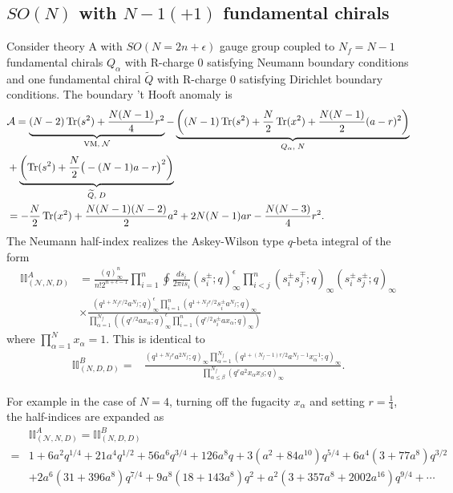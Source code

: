 \documentclass[12pt]{article}
\newcommand{\Acal}{\mathcal{A}}
\newcommand{\Ncal}{\mathcal{N}}
\DeclareMathOperator*{\Tr}{{\rm Tr}}
\numberwithin{equation}{section}
\begin{document}
\subsection{$SO(N)$ with $N-1 (+1)$ fundamental chirals}
\label{sec_SON_N_integrals}
Consider theory A with $SO(N = 2n + \epsilon)$ gauge group coupled to $N_f = N - 1$ fundamental chirals $Q_{\alpha}$ 
with R-charge $0$ satisfying Neumann boundary conditions and one fundamental chiral $\widetilde{Q}$ with R-charge $0$ satisfying Dirichlet boundary conditions. The boundary 't Hooft anomaly is
\begin{align}
\label{bdy_SON_N_anomA}
&
\Acal = \underbrace{(N-2)\Tr(s^2) + \frac{N(N-1)}{4}r^2}_{\textrm{VM}, \; \Ncal}
 - \underbrace{\left( (N-1)\Tr(s^2) + \frac{N}{2}\Tr(x^2) + \frac{N(N-1)}{2}(a-r)^2 \right)}_{Q_{\alpha}, \; N}
  \nonumber \\
 & + \underbrace{\left( \Tr(s^2) + \frac{N}{2}\big( -(N-1) a - r \big)^2 \right)}_{\widetilde{Q}, \; D}
   \nonumber \\
  &= - \frac{N}{2} \Tr(x^2) + \frac{N(N-1)(N-2)}{2}a^2 + 2N(N-1)ar - \frac{N(N-3)}{4}r^2. 
\end{align}
The Neumann half-index realizes the Askey-Wilson type $q$-beta integral of the form
\begin{align}
\label{SON_N_hindexA}
\mathbb{II}_{(\mathcal{N},N,D)}^A
&=\frac{(q)_{\infty}^n}{n! 2^{n + \epsilon - 1}} \prod_{i=1}^n \oint \frac{ds_i}{2\pi i s_i}
(s_i^{\pm}; q)_{\infty}^{\epsilon}
\prod_{i < j}^n (s_i^{\pm} s_j^{\mp}; q)_{\infty} (s_i^{\pm} s_j^{\pm}; q)_{\infty}
 \nonumber \\
& \times
\frac{(q^{1+N_fr/2} a^{N_f}; q)_{\infty}^{\epsilon} \prod_{i = 1}^n (q^{1+N_fr/2} s_i^{\pm} a^{N_f}; q)_{\infty}}{\prod_{\alpha = 1}^{N_f} \left( (q^{r/2} a x_{\alpha}; q)_{\infty}^{\epsilon} \prod_{i = 1}^n (q^{r/2} s_i^{\pm} a x_{\alpha}; q)_{\infty} \right)}
\end{align}
where $\prod_{\alpha = 1}^{N} x_{\alpha} = 1$.
This is identical to 
\begin{align}
\label{SON_N_hindexB}
\mathbb{II}_{(N,D,D)}^B = &
 \frac{(q^{1+N_f r} a^{2N_f}; q)_{\infty} \prod_{\alpha=1}^{N_f} (q^{1+(N_f - 1)r/2} a^{N_f - 1} x_{\alpha}^{-1}; q)_{\infty}}{\prod_{\alpha \le \beta}^{N_f} (q^r a^2 x_{\alpha} x_{\beta}; q)_{\infty}}. 
\end{align}

For example in the case of $N = 4$, turning off the fugacity $x_{\alpha}$ and setting $r=\frac14$, 
the half-indices are expanded as 
\begin{align}
& \mathbb{II}_{(\mathcal{N},N,D)}^A
 = \mathbb{II}_{(N,D,D)}^B
\nonumber\\
 = &  1 + 6 a^2 q^{1/4} + 21 a^4 q^{1/2} + 56 a^6 q^{3/4} + 126 a^8 q + 
 3 (a^2 + 84 a^10) q^{5/4} + 6 a^4 (3 + 77 a^8) q^{3/2}
 \nonumber \\
 & +
 2 a^6 (31 + 396 a^8) q^{7/4} + 9 a^8 (18 + 143 a^8) q^2 + 
 a^2 (3 + 357 a^8 + 2002 a^16) q^{9/4}
 + \cdots
\end{align}
\end{document}
